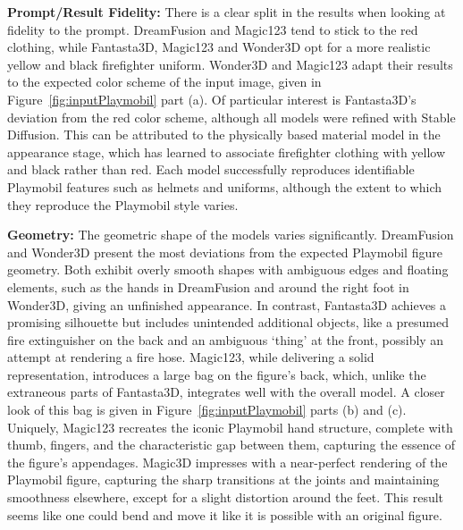 \textbf{Prompt/Result Fidelity:} There is a clear split in the results when looking at fidelity to the prompt. DreamFusion and Magic123 tend to stick to the red clothing, while Fantasta3D, Magic123 and Wonder3D opt for a more realistic yellow and black firefighter uniform. Wonder3D and Magic123 adapt their results to the expected color scheme of the input image, given in Figure~\ref{fig:inputPlaymobil} part (a). Of particular interest is Fantasta3D's deviation from the red color scheme, although all models were refined with Stable Diffusion. This can be attributed to the physically based material model in the appearance stage, which has learned to associate firefighter clothing with yellow and black rather than red. Each model successfully reproduces identifiable Playmobil features such as helmets and uniforms, although the extent to which they reproduce the Playmobil style varies.

\textbf{Geometry:} The geometric shape of the models varies significantly. DreamFusion and Wonder3D present the most deviations from the expected Playmobil figure geometry. Both exhibit overly smooth shapes with ambiguous edges and floating elements, such as the hands in DreamFusion and around the right foot in Wonder3D, giving an unfinished appearance. In contrast, Fantasta3D achieves a promising silhouette but includes unintended additional objects, like a presumed fire extinguisher on the back and an ambiguous `thing' at the front, possibly an attempt at rendering a fire hose. Magic123, while delivering a solid representation, introduces a large bag on the figure's back, which, unlike the extraneous parts of Fantasta3D, integrates well with the overall model. A closer look of this bag is given in Figure~\ref{fig:inputPlaymobil} parts (b) and (c). Uniquely, Magic123 recreates the iconic Playmobil hand structure, complete with thumb, fingers, and the characteristic gap between them, capturing the essence of the figure's appendages. Magic3D impresses with a near-perfect rendering of the Playmobil figure, capturing the sharp transitions at the joints and maintaining smoothness elsewhere, except for a slight distortion around the feet. This result seems like one could bend and move it like it is possible with an original figure.

